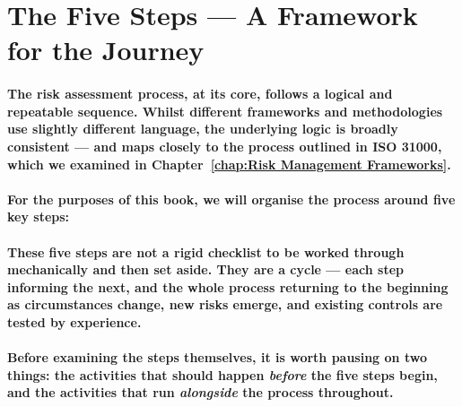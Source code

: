 \section{The Five Steps — A Framework for the Journey}
\paragraph{The risk assessment process, at its core, follows a logical and repeatable sequence. Whilst different frameworks and methodologies use slightly different language, the underlying logic is broadly consistent — and maps closely to the process outlined in ISO 31000, which we examined in Chapter~\ref{chap:Risk Management Frameworks}.}
\paragraph{For the purposes of this book, we will organise the process around \textbf{five key steps}:}
\begin{enumerate}
\end{enumerate}
\paragraph{These five steps are not a rigid checklist to be worked through mechanically and then set aside. They are a cycle — each step informing the next, and the whole process returning to the beginning as circumstances change, new risks emerge, and existing controls are tested by experience.}
\paragraph{Before examining the steps themselves, it is worth pausing on two things: the activities that should happen \textit{before} the five steps begin, and the activities that run \textit{alongside} the process throughout.}

